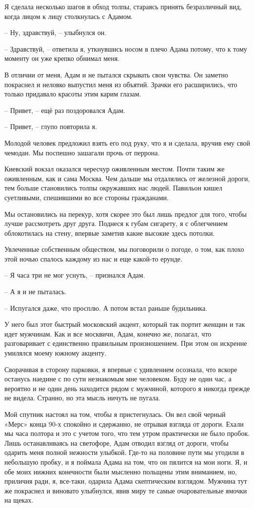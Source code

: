 \documentclass[
]{book}
\begin{document}
Я сделала несколько шагов в обход толпы, стараясь принять безразличный вид, когда лицом к лицу столкнулась с Адамом.

-- Ну, здравствуй, -- улыбнулся он.

-- Здравствуй, -- ответила я, уткнувшись носом в плечо Адама потому, что к тому моменту он уже крепко обнимал меня.

В отличии от меня, Адам и не пытался скрывать свои чувства. Он заметно покраснел и неловко выпустил меня из объятий. Зрачки его расширились, что только придавало красоты этим карим глазам.

-- Привет, -- ещё раз поздоровался Адам.

-- Привет, -- глупо повторила я.

Молодой человек предложил взять его под руку, что я и сделала, вручив ему свой чемодан. Мы поспешно зашагали прочь от перрона.

Киевский вокзал оказался чересчур оживленным местом. Почти таким же оживленным, как и сама Москва. Чем дальше мы отдалялись от железной дороги, тем больше становились толпы окружавших нас людей. Павильон кишел суетливыми, спешившими во все стороны гражданами.

Мы остановились на перекур, хотя скорее это был лишь предлог для того, чтобы лучше рассмотреть друг друга. Поднеся к губам сигарету, я с облегчением облокотилась на стену, впервые заметив какие высокие здесь потолки.

Увлеченные собственным обществом, мы поговорили о погоде, о том, как плохо этой ночью спалось каждому из нас и еще какой-то ерунде.

-- Я часа три не мог уснуть, -- признался Адам.

-- А я и не пыталась.

-- Испугался даже, что просплю. А потом встал раньше будильника.

У него был этот быстрый московский акцент, который так портит женщин и так идет мужчинам. Как и все москвичи, Адам, конечно же, полагал, что разговаривает с единственно правильным произношением. При этом он искренне умилялся моему южному акценту.

Сворачивая в сторону парковки, я впервые с удивлением осознала, что вскоре останусь наедине с по сути незнакомым мне человеком. Буду не один час, а вероятно и не один день находится рядом с мужчиной, которого я никогда прежде не видела. Странно, но эта мысль ничуть не пугала.

Мой спутник настоял на том, чтобы я пристегнулась. Он вел свой черный «Мерс» конца 90-х спокойно и сдержанно, не отрывая взгляда от дороги. Ехали мы часа полтора и это с учетом того, что тем утром практически не было пробок. Лишь останавливаясь на светофоре, Адам отводил взгляд от дороги, чтобы одарить меня полной нежности улыбкой. Где-то на половине пути мы угодили в небольшую пробку, и я поймала Адама на том, что он пялится на мои ноги. Я, и обе моих нижних конечности были мысленно польщены этим вниманием, но, приличия ради, я, все-таки, одарила Адама скептическим взглядом. Мужчина тут же покраснел и виновато улыбнулся, явив миру те самые очаровательные ямочки на щеках.
\end{document}
